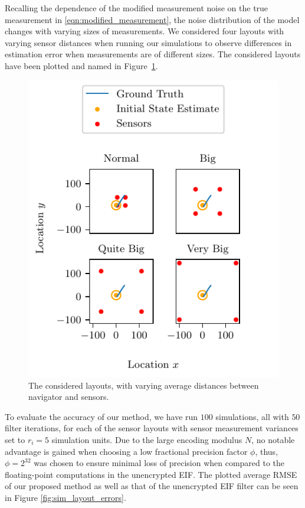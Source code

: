 \documentclass[10pt,letterpaper,oneside,twocolumn,journal]{IEEEtran}
\theoremstyle{definition}
\theoremstyle{definition}
\theoremstyle{remark}
\begin{document}
Recalling the dependence of the modified measurement noise on the true measurement in \eqref{eqn:modified_measurement}, the noise distribution of the model changes with varying sizes of measurements. We considered four layouts with varying sensor distances when running our simulations to observe differences in estimation error when measurements are of different sizes. The considered layouts have been plotted and named in Figure~\ref{fig:sim_layouts}.
\begin{figure}[htbp]
\centering
\includegraphics{images/layouts.pdf}
\vspace{-\baselineskip}
\caption{The considered layouts, with varying average distances between navigator and sensors.}
\label{fig:sim_layouts}
\end{figure}
To evaluate the accuracy of our method, we have run $100$ simulations, all with $50$ filter iterations, for each of the sensor layouts with sensor measurement variances set to $r_i=5$ simulation units. Due to the large encoding modulus $N$, no notable advantage is gained when choosing a low fractional precision factor $\phi$, thus, $\phi=2^{32}$ was chosen to ensure minimal loss of precision when compared to the floating-point computations in the unencrypted EIF. The plotted average RMSE of our proposed method as well as that of the unencrypted EIF filter can be seen in Figure \ref{fig:sim_layout_errors}.
\end{document}
